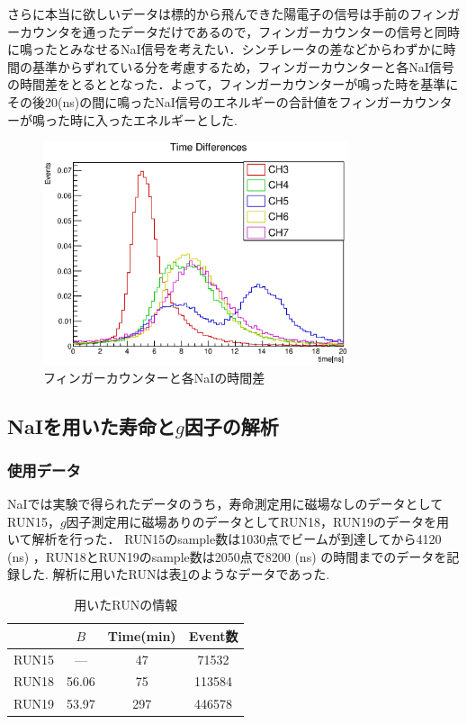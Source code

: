 さらに本当に欲しいデータは標的から飛んできた陽電子の信号は手前のフィンガーカウンタを通ったデータだけであるので，フィンガーカウンターの信号と同時に鳴ったとみなせるNaI信号を考えたい．シンチレータの差などからわずかに時間の基準からずれている分を考慮するため，フィンガーカウンターと各NaI信号の時間差をとるととなった．よって，フィンガーカウンターが鳴った時を基準にその後20(ns)の間に鳴ったNaI信号のエネルギーの合計値をフィンガーカウンターが鳴った時に入ったエネルギーとした.

\begin{figure}[bht]
  \centering
  \includegraphics[width=0.8\textwidth]{figure/hatano/coincidence.eps}
  \caption{フィンガーカウンターと各NaIの時間差}
  \label{hatano_fig:coincidence}
\end{figure}


\subsection{NaIを用いた寿命と$g$因子の解析}
\subsubsection{使用データ}
NaIでは実験で得られたデータのうち，寿命測定用に磁場なしのデータとしてRUN15，$g$因子測定用に磁場ありのデータとしてRUN18，RUN19のデータを用いて解析を行った．
RUN15のsample数は1030点でビームが到達してから4120 (ns) ，RUN18とRUN19のsample数は2050点で8200 (ns) の時間までのデータを記録した.
解析に用いたRUNは表\ref{tab:RUN_info}のようなデータであった.

\begin{table}[H]%
  \caption{用いたRUNの情報}
  \centering
  \begin{tabular}{cccc}\toprule
    & $B$ & Time\;(min) & Event数\\ \midrule
    RUN15 & --- & 47 & 71532 \\
    RUN18 & 56.06 & 75 & 113584 \\
    RUN19 & 53.97 & 297 & 446578 \\ \bottomrule
  \end{tabular}
  \label{tab:RUN_info}
\end{table}

